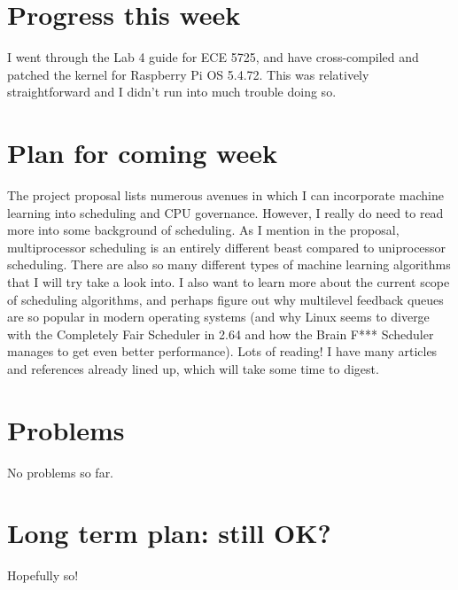 \documentclass[12pt]{article}
\def\ind{\hspace*{0.3in}}
\begin{document}
\setlength{\parindent}{0in}
\addtolength{\parskip}{0.1cm}
\setlength{\fboxrule}{.5mm}\setlength{\fboxsep}{1.2mm}
\newlength{\boxlength}\setlength{\boxlength}{\textwidth}
\addtolength{\boxlength}{-4mm}
\begin{center}
\end{center}
\vspace{2mm}

\section*{Progress this week}
\ind I went through the Lab 4 guide for ECE 5725, and have cross-compiled and patched the kernel for Raspberry Pi OS 5.4.72. This was relatively straightforward and I didn't run into much trouble doing so. 
\section*{Plan for coming week}
\ind The project proposal lists numerous avenues in which I can incorporate machine learning into scheduling and CPU governance. However, I really do need to read more into some background of scheduling. As I mention in the proposal, multiprocessor scheduling is an entirely different beast compared to uniprocessor scheduling. There are also so many different types of machine learning algorithms that I will try take a look into. I also want to learn more about the current scope of scheduling algorithms, and perhaps figure out why multilevel feedback queues are so popular in modern operating systems (and why Linux seems to diverge with the Completely Fair Scheduler in 2.64 and how the Brain F*** Scheduler manages to get even better performance). Lots of reading! I have many articles and references already lined up, which will take some time to digest.
\section*{Problems}
No problems so far.
\section*{Long term plan: still OK?}
Hopefully so! 
\end{document}
